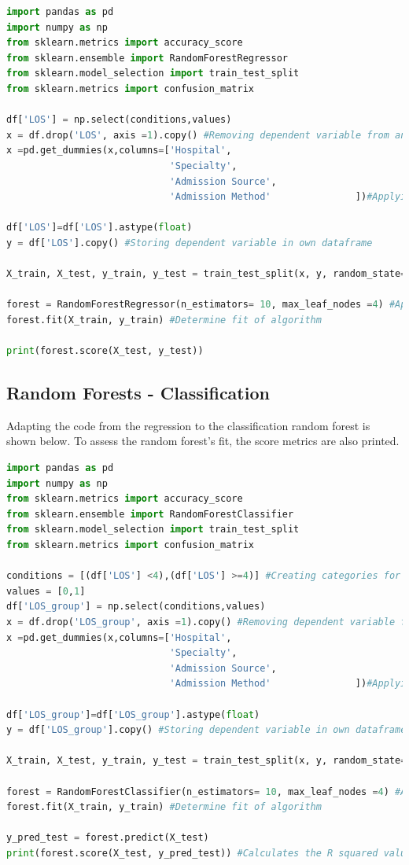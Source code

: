 \documentclass[../thesis.tex]{subfiles}
\begin{document}
\begin{lstlisting}[language = python]
import pandas as pd
import numpy as np
from sklearn.metrics import accuracy_score
from sklearn.ensemble import RandomForestRegressor
from sklearn.model_selection import train_test_split
from sklearn.metrics import confusion_matrix

df['LOS'] = np.select(conditions,values)
x = df.drop('LOS', axis =1).copy() #Removing dependent variable from analysis
x =pd.get_dummies(x,columns=['Hospital',
                             'Specialty',
                             'Admission Source',
                             'Admission Method'               ])#Applying one-hot encoding

df['LOS']=df['LOS'].astype(float)
y = df['LOS'].copy() #Storing dependent variable in own dataframe

X_train, X_test, y_train, y_test = train_test_split(x, y, random_state=0,test_size=0.2, stratify=y)#Creating training and testing data

forest = RandomForestRegressor(n_estimators= 10, max_leaf_nodes =4) #Applying the algorithm
forest.fit(X_train, y_train) #Determine fit of algorithm

print(forest.score(X_test, y_test))
\end{lstlisting}


\subsection{Random Forests - Classification}
Adapting the code from the regression to the classification random forest is shown below.  To assess the random forest's fit, the score metrics are also printed.
\begin{lstlisting}[language = python]
import pandas as pd
import numpy as np
from sklearn.metrics import accuracy_score
from sklearn.ensemble import RandomForestClassifier
from sklearn.model_selection import train_test_split
from sklearn.metrics import confusion_matrix

conditions = [(df['LOS'] <4),(df['LOS'] >=4)] #Creating categories for prediction
values = [0,1]
df['LOS_group'] = np.select(conditions,values)
x = df.drop('LOS_group', axis =1).copy() #Removing dependent variable from analysis
x =pd.get_dummies(x,columns=['Hospital',
                             'Specialty',
                             'Admission Source',
                             'Admission Method'               ])#Applying one-hot encoding

df['LOS_group']=df['LOS_group'].astype(float)
y = df['LOS_group'].copy() #Storing dependent variable in own dataframe

X_train, X_test, y_train, y_test = train_test_split(x, y, random_state=0,test_size=0.2, stratify=y)#Creating training and testing data

forest = RandomForestClassifier(n_estimators= 10, max_leaf_nodes =4) #Applying the algorithm
forest.fit(X_train, y_train) #Determine fit of algorithm

y_pred_test = forest.predict(X_test)
print(forest.score(X_test, y_pred_test)) #Calculates the R squared value


\end{lstlisting}
\end{document}
